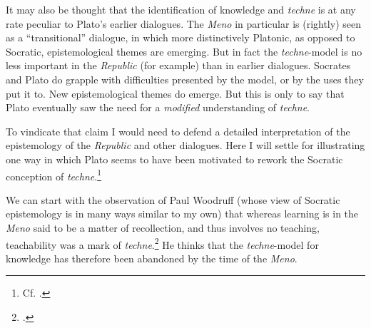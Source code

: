 ﻿\documentclass[11pt]{amsart}
\begin{document}
It may also be thought that the identification of knowledge and \emph{techne} is at any rate peculiar to Plato's earlier dialogues. The \emph{Meno} in particular is (rightly) seen as a ``transitional'' dialogue, in which more distinctively Platonic, as opposed to Socratic, epistemological themes are emerging. But in fact the \emph{techne}-model is no less important in the \emph{Republic} (for example) than in earlier dialogues. Socrates and Plato do grapple with difficulties presented by the model, or by the uses they put it to. New epistemological themes do emerge. But this is only to say that Plato eventually saw the need for a \emph{modified} understanding of \emph{techne}. 






To vindicate that claim I would need to defend a detailed interpretation of the epistemology of the \emph{Republic} and other dialogues. Here I will settle for illustrating one way in which Plato seems to have been motivated to rework the Socratic conception of \emph{techne}.\footnote{Cf. \citet[157--161]{asmith1998}.}

We can start with the observation of Paul Woodruff (whose view of Socratic epistemology is in many ways similar to my own) that whereas learning is in the \emph{Meno} said to be a matter of recollection, and thus involves no teaching, teachability was a mark of \emph{techne}.\footnote{\citet[81]{woodruff1990pse}.} He thinks that the \emph{techne}-model for knowledge has therefore been abandoned by the time of the \emph{Meno}.






\end{document}
